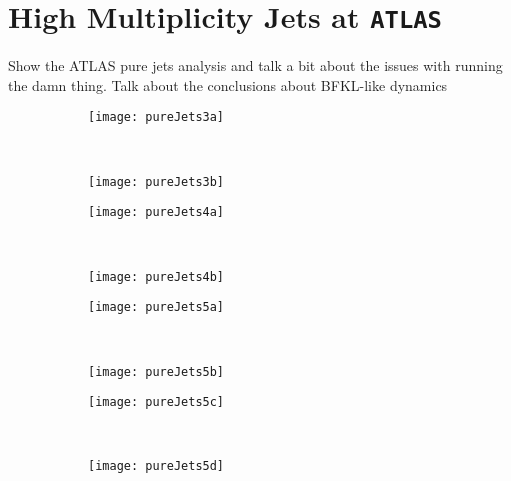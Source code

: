 \chapter{High Multiplicity Jets at \texttt{ATLAS}}
\label{chap:ATLAS}

	Show the ATLAS pure jets analysis and talk a bit about the issues with running the damn thing.  Talk about the conclusions about BFKL-like dynamics

	\begin{figure}[H]
		\centering
		\begin{subfigure}[b]{0.48\textwidth}
			\texttt{[image: pureJets3a]}
			\caption{}
			\label{fig:}
		\end{subfigure}
		~
		\begin{subfigure}[b]{0.48\textwidth}
			\texttt{[image: pureJets3b]}
			\caption{}
			\label{fig:}
		\end{subfigure}
		\caption{}
		\label{fig:}

		\begin{subfigure}[b]{0.48\textwidth}
			\texttt{[image: pureJets4a]}
			\caption{}
			\label{fig:}
		\end{subfigure}
		~
		\begin{subfigure}[b]{0.48\textwidth}
			\texttt{[image: pureJets4b]}
			\caption{}
			\label{fig:}
		\end{subfigure}
		\caption{}
		\label{fig:}
	\end{figure}

	\begin{figure}[H]
		\centering
		\begin{subfigure}[b]{0.48\textwidth}
			\texttt{[image: pureJets5a]}
			\caption{}
			\label{fig:}
		\end{subfigure}
		~
		\begin{subfigure}[b]{0.48\textwidth}
			\texttt{[image: pureJets5b]}
			\caption{}
			\label{fig:}
		\end{subfigure}
		\caption{}
		\label{fig:}

		\begin{subfigure}[b]{0.48\textwidth}
			\texttt{[image: pureJets5c]}
			\caption{}
			\label{fig:}
		\end{subfigure}
		~
		\begin{subfigure}[b]{0.48\textwidth}
			\texttt{[image: pureJets5d]}
			\caption{}
			\label{fig:}
		\end{subfigure}
		\caption{}
		\label{fig:}
	\end{figure}

